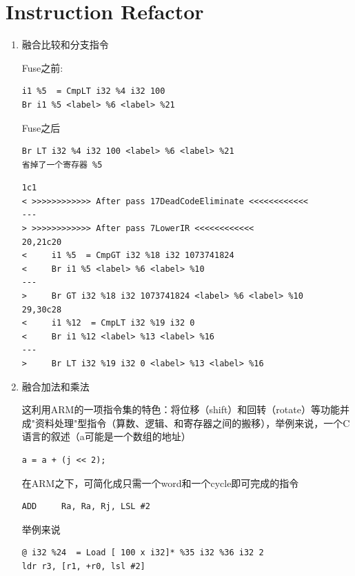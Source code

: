 \documentclass[a4paper]{article}
\theoremstyle{definition}
\begin{document}
\section{Instruction Refactor}
\begin{enumerate}
    \item 融合比较和分支指令



Fuse之前:
\begin{verbatim}
i1 %5  = CmpLT i32 %4 i32 100 
Br i1 %5 <label> %6 <label> %21
\end{verbatim}
Fuse之后
\begin{verbatim}
Br LT i32 %4 i32 100 <label> %6 <label> %21 
省掉了一个寄存器 %5
\end{verbatim}
\begin{verbatim}
1c1
< >>>>>>>>>>>> After pass 17DeadCodeEliminate <<<<<<<<<<<<
---
> >>>>>>>>>>>> After pass 7LowerIR <<<<<<<<<<<<
20,21c20
<     i1 %5  = CmpGT i32 %18 i32 1073741824 
<     Br i1 %5 <label> %6 <label> %10 
---
>     Br GT i32 %18 i32 1073741824 <label> %6 <label> %10 
29,30c28
<     i1 %12  = CmpLT i32 %19 i32 0 
<     Br i1 %12 <label> %13 <label> %16 
---
>     Br LT i32 %19 i32 0 <label> %13 <label> %16 
\end{verbatim}
\item 融合加法和乘法

这利用ARM的一项指令集的特色：将位移（shift）和回转（rotate）等功能并成"资料处理"型指令（算数、逻辑、和寄存器之间的搬移），举例来说，一个C语言的叙述（a可能是一个数组的地址）
\begin{verbatim}
a = a + (j << 2);
\end{verbatim}
在ARM之下，可简化成只需一个word和一个cycle即可完成的指令
\begin{verbatim}
ADD     Ra, Ra, Rj, LSL #2
\end{verbatim}
举例来说
\begin{verbatim}
@ i32 %24  = Load [ 100 x i32]* %35 i32 %36 i32 2 
ldr r3, [r1, +r0, lsl #2]
\end{verbatim}
\end{enumerate}
\printbibliography
\end{document}
